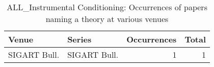 \begin{table*}[t]
\begin{tabular}{llrr}
Venue & Series & Occurrences & Total\\\hline
\multirow{1}{*}{SIGART Bull.} & SIGART Bull. & 1 & \multirow{1}{*}{1}\\
\end{tabular}
\caption{ALL\_Instrumental Conditioning: Occurrences of papers naming a theory at various venues}
\end{table*}